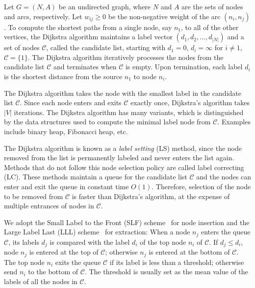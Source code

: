   Let $G=(N,A)$ be an undirected graph, where $N$ and $A$ are the sets of nodes and arcs, respectively.
  Let $w_{ij}\geq 0$ be the non-negative weight of the arc $(n_i,n_j)$.
  To compute the shortest paths from a single node, say $n_1$, to all of the other vertices,
  the Dijkstra algorithm maintains a label vector $(d_1,d_2,...,d_{|N|})$ and a set of nodes $\mathcal{C}$, called the candidate list,
  starting with $d_1=0$, $d_i=\infty$ for $i\neq 1$, $\mathcal{C}=\{1\}$.
  The Dijkstra algorithm iteratively processes the nodes from the candidate list $\mathcal{C}$ and terminates when $\mathcal{C}$ is empty.
  Upon termination, each label $d_i$ is the shortest distance from the source $n_1$ to node $n_i$.

  The Dijkstra algorithm takes the node with the smallest label in the candidate list $\mathcal{C}$.
  Since each node enters and exits $\mathcal{C}$ exactly once, Dijkstra's algorithm takes $|V|$ iterations.
  The Dijkstra algorithm has many variants,
  which is distinguished by the data structures used to compute the minimal label node from $\mathcal{C}$.
  Examples include binary heap, Fibonacci heap, etc.

  The Dijkstra algorithm is known as a \textit{label setting} (LS) method, since the node removed from the list is permanently labeled and never enters the list again.
  Methods that do not follow this node selection policy are called label correcting (LC).
  These methods maintain a queue for the candidate list $\mathcal{C}$ and the nodes can enter and exit the queue in constant time $O(1)$.
  Therefore, selection of the node to be removed from $\mathcal{C}$ is faster than Dijkstra's algorithm, at the expense of multiple entrances of nodes in $\mathcal{C}$.

  We adopt the Small Label to the Front (SLF) scheme~\cite{bertsekas1993simple} for node insertion and the Large Label Last (LLL) scheme~\cite{Bertsekas96} for extraction:
  When a node $n_j$ enters the queue $\mathcal{C}$, its labels $d_j$ is compared with the label $d_i$ of the top node $n_i$ of $\mathcal{C}$.
  If $d_j\leq d_i$, node $n_j$ is entered at the top of $\mathcal{C}$; otherwise $n_j$ is entered at the bottom of $\mathcal{C}$.
  The top node $n_i$ exits the queue $\mathcal{C}$ if its label is less than a threshold;
  otherwise send $n_i$ to the bottom of $\mathcal{C}$.
  The threshold is usually set as the mean value of the labels of all the nodes in $\mathcal{C}$.


